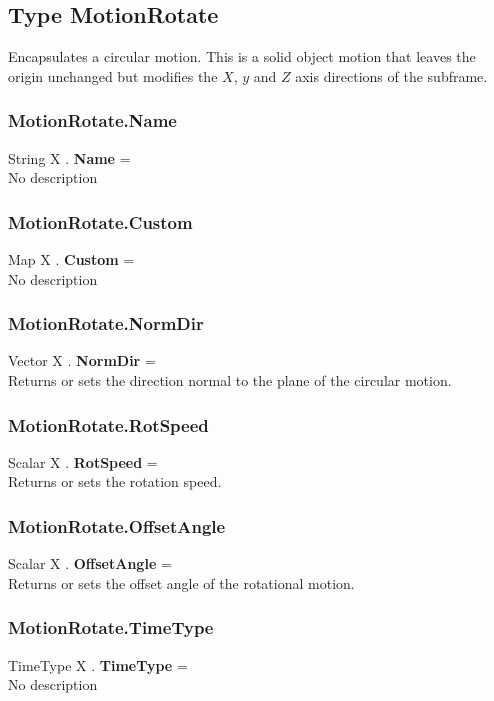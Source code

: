 \subsection{Type MotionRotate \label{T:MotionRotate}}
Encapsulates a circular motion. This is a solid object motion that leaves the origin unchanged but modifies the $X$, $y$ and $Z$ axis directions of the subframe.

\subsubsection{MotionRotate.Name \label{F:MotionRotate:Name}}
String X . \textbf{Name} = \\
No description

\subsubsection{MotionRotate.Custom \label{F:MotionRotate:Custom}}
Map X . \textbf{Custom} = \\
No description

\subsubsection{MotionRotate.NormDir \label{F:MotionRotate:NormDir}}
Vector X . \textbf{NormDir} = \\
Returns or sets the direction normal to the plane of the circular motion.

\subsubsection{MotionRotate.RotSpeed \label{F:MotionRotate:RotSpeed}}
Scalar X . \textbf{RotSpeed} = \\
Returns or sets the rotation speed.

\subsubsection{MotionRotate.OffsetAngle \label{F:MotionRotate:OffsetAngle}}
Scalar X . \textbf{OffsetAngle} = \\
Returns or sets the offset angle of the rotational motion.

\subsubsection{MotionRotate.TimeType \label{F:MotionRotate:TimeType}}
TimeType X . \textbf{TimeType} = \\
No description


